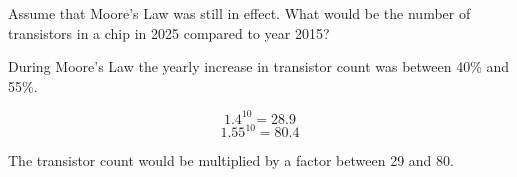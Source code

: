 \begin{acexercise}\end{acexercise}

Assume that Moore's Law was still in effect.
What would be the number of transistors in a chip in 2025 compared to year 2015?

\begin{acsolution}\end{acsolution}

During Moore's Law the yearly increase in transistor count was between 40\% and 55\%.

\[1.4^{10} = 28.9\]
\[1.55^{10} = 80.4\]

The transistor count would be multiplied by a factor between 29 and 80.
